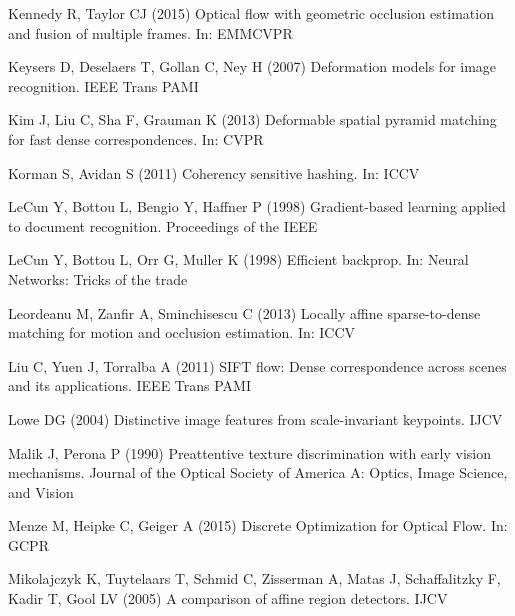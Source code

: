 \documentclass[twocolumn,natbib]{svjour3}
\begin{document}
\begin{thebibliography}{57}
Kennedy R, Taylor CJ (2015) Optical flow with geometric occlusion estimation
  and fusion of multiple frames. In: EMMCVPR

Keysers D, Deselaers T, Gollan C, Ney H (2007) Deformation models for image
  recognition. IEEE Trans PAMI

Kim J, Liu C, Sha F, Grauman K (2013) Deformable spatial pyramid matching for
  fast dense correspondences. In: CVPR

Korman S, Avidan S (2011) Coherency sensitive hashing. In: ICCV

LeCun Y, Bottou L, Bengio Y, Haffner P (1998{}) Gradient-based
  learning applied to document recognition. Proceedings of the IEEE

LeCun Y, Bottou L, Orr G, Muller K (1998{}) Efficient backprop. In:
  Neural Networks: Tricks of the trade

Leordeanu M, Zanfir A, Sminchisescu C (2013) Locally affine sparse-to-dense
  matching for motion and occlusion estimation. In: ICCV

Liu C, Yuen J, Torralba A (2011) {SIFT} flow: Dense correspondence across
  scenes and its applications. IEEE Trans PAMI

Lowe DG (2004) Distinctive image features from scale-invariant keypoints. IJCV

Malik J, Perona P (1990) {Preattentive texture discrimination with early vision
  mechanisms}. Journal of the Optical Society of America A: Optics, Image
  Science, and Vision

Menze M, Heipke C, Geiger A (2015) {Discrete Optimization for Optical Flow}.
  In: GCPR

Mikolajczyk K, Tuytelaars T, Schmid C, Zisserman A, Matas J, Schaffalitzky F,
  Kadir T, Gool LV (2005) A comparison of affine region detectors. IJCV


\end{thebibliography}
\end{document}
